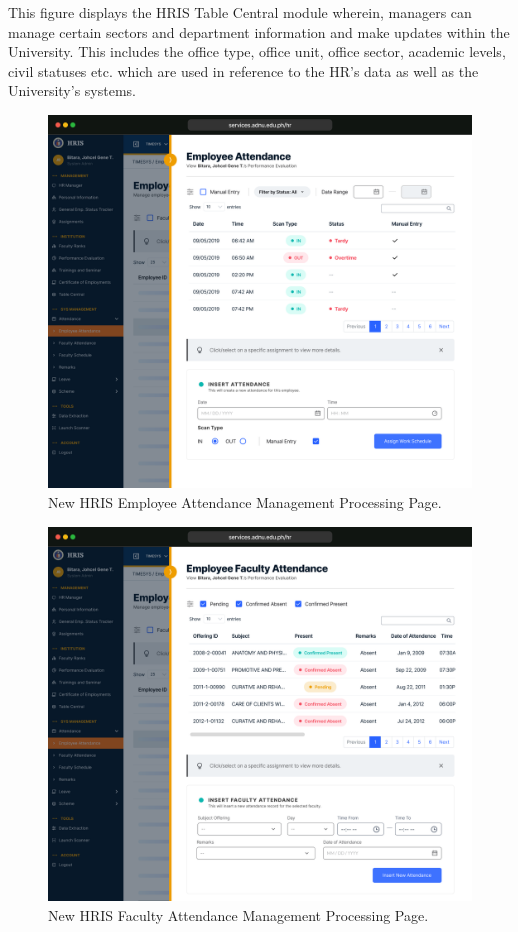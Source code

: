     This figure displays the HRIS Table Central module wherein, managers can manage certain sectors and department information and make updates within the University. This includes the office type, office unit, office sector, academic levels, civil statuses etc. which are used in reference to the HR's data as well as the University's systems.

    \begin{figure}[H]
        \centering
        \includegraphics[width=1\linewidth]{figures/app/attendance-emp.png}
        \caption{New HRIS Employee Attendance Management Processing Page.}
        \label{fig:app-attendance-emp}
    \end{figure}

    \begin{figure}[H]
        \centering
        \includegraphics[width=1\linewidth]{figures/app/attendance-fac.png}
        \caption{New HRIS Faculty Attendance Management Processing Page.}
        \label{fig:app-attendance-fac}
    \end{figure}

